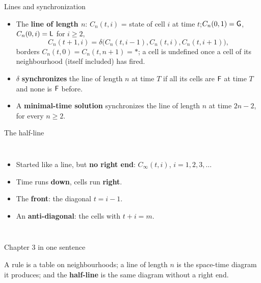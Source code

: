 \begin{frame}{Lines and synchronization}
\begin{itemize}
\item The \textbf{line of length $n$}: $C_n(t,i)$ = state of cell $i$ at time $t$;\quad $C_n(0,1)=\mathsf G$,\ $C_n(0,i)=\mathsf L$ for $i\ge2$,
\[C_n(t+1,i)=\delta\bigl(C_n(t,i-1),C_n(t,i),C_n(t,i+1)\bigr),\]
borders $C_n(t,0)=C_n(t,n+1)=\ast$; a cell is undefined once a cell of its neighbourhood (itself included) has fired.
\item $\delta$ \textbf{synchronizes} the line of length $n$ at time $T$ if all its cells are $\mathsf F$ at time $T$ and none is $\mathsf F$ before.
\item A \textbf{minimal-time solution} synchronizes the line of length $n$ at time $2n-2$, for every $n\ge2$.
\end{itemize}
\end{frame}

\begin{frame}{The half-line}
\begin{columns}[T]
\begin{itemize}
\item Started like a line, but \textbf{no right end}: $C_\infty(t,i)$, $i=1,2,3,\dots$
\item Time runs \textbf{down}, cells run \textbf{right}.
\item The \textbf{front}: the diagonal $t=i-1$.
\item An \textbf{anti-diagonal}: the cells with $t+i=m$.
\end{itemize}
\end{columns}
\end{frame}

\begin{frame}{Chapter 3 in one sentence}
\vspace{4ex}
\begin{plainbox}\large
A rule is a table on neighbourhoods; a line of length $n$ is the space-time diagram it produces; and the \textbf{half-line} is the same diagram without a right end.
\end{plainbox}
\end{frame}

